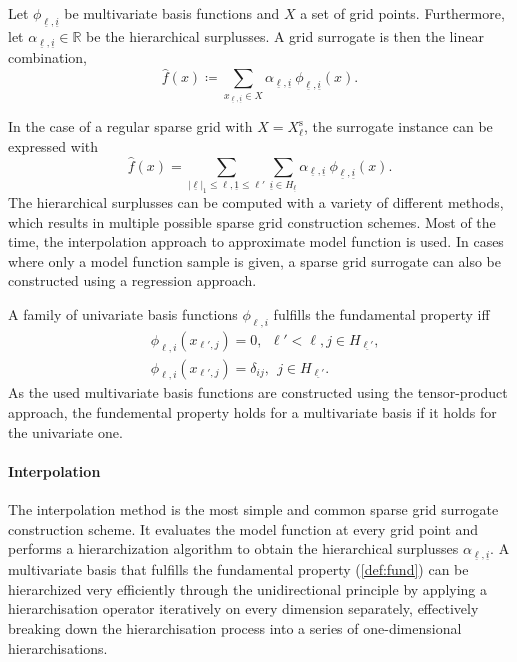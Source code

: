 \documentclass[
  a4paper,  %
  twoside,  %
  bibliography=totoc,
  headsepline,
  cleardoublepage=empty,
  parskip=half,
  draft=false
]{scrbook}
\begin{document}
\begin{definition}
Let $\phi_{\underline{\ell},\underline{i}}$ be multivariate basis functions and $X$ a set of grid points.
Furthermore, let $\alpha_{\underline{\ell},\underline{i}} \in \mathds{R}$ be the hierarchical surplusses.
A grid surrogate is then the linear combination,
\begin{equation}
\hat{f}(x) \coloneqq \sum_{x_{\underline{\ell},\underline{i}} \in X} \alpha_{\underline{\ell},\underline{i}} ~ \phi_{
\underline{\ell},\underline{i}}(x).
\end{equation}
\end{definition}
%
In the case of a regular sparse grid with $X=X^{\mathrm{s}}_{\ell}$, the surrogate instance can be expressed with
\begin{equation}
\hat{f}(x) = \sum_{|\underline{\ell}|_1 \leq \ell, \underline{1} \leq \ell'} \sum_{\underline{i} \in {H_{\underline{\ell}}}} \alpha_{\underline{\ell},\underline{i}} ~ \phi_{
\underline{\ell},\underline{i}}(x).
\end{equation}
%
The hierarchical surplusses can be computed with a variety of different methods, which results in multiple possible sparse grid construction schemes.
Most of the time, the interpolation approach to approximate model function is used.
In cases where only a model function sample is given, a sparse grid surrogate can also be constructed using a regression approach.

\begin{definition}
A family of univariate basis functions $\phi_{\ell,i}$ fulfills the fundamental property iff
\begin{equation}
\begin{split}
&\phi_{\ell,i}(x_{\ell', j}) = 0, ~~  \ell' < \ell, j \in H_{\underline{\ell'}},\\
&\phi_{\ell,i}(x_{\ell', j}) = \delta_{ij}, ~~  j \in H_{\underline{\ell'}}.
\end{split}
\end{equation}
As the used multivariate basis functions are constructed using the tensor-product approach, the fundemental property holds for a multivariate basis if it holds for the univariate one.
\label{def:fund}
\end{definition}

\paragraph{Interpolation}
The interpolation method is the most simple and common sparse grid surrogate construction scheme.
It evaluates the model function at every grid point and performs a hierarchization algorithm to obtain the hierarchical surplusses $\alpha_{\underline{\ell},\underline{i}}$.
A multivariate basis that fulfills the fundamental property (\cref{def:fund}) can be hierarchized very efficiently through the unidirectional principle \cite{Balder1994} by applying a hierarchisation operator iteratively on every dimension separately, effectively breaking down the hierarchisation process into a series of one-dimensional hierarchisations.
\end{document}
